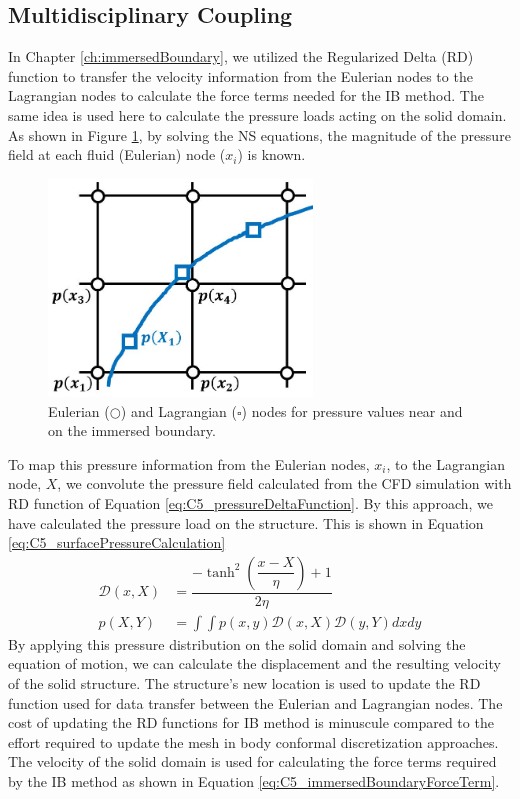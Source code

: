 \subsection{Multidisciplinary Coupling}
In Chapter \ref{ch:immersedBoundary}, we utilized the Regularized Delta (RD) function to transfer the velocity information from the Eulerian nodes to the Lagrangian nodes to calculate the force terms needed for the IB method. The same idea is used here to calculate the pressure loads acting on the solid domain. As shown in Figure \ref{fig:C5_pressureMapping}, by solving the NS equations, the magnitude of the pressure field at each fluid (Eulerian) node ($x_i$) is known.
%
\begin{figure}[H]
    \centering
    \includegraphics[width=7.00cm]{Chapter_5/figure/Chapter5_pressureMapping.jpg}
    \caption{Eulerian ($\bigcirc$) and Lagrangian ($\square$) nodes for pressure values near and on the immersed boundary.}
    \label{fig:C5_pressureMapping}
\end{figure}
%
To map this pressure information from the Eulerian nodes, $x_i$, to the Lagrangian node, $X$, we convolute the pressure field calculated from the CFD simulation with RD function of Equation \eqref{eq:C5_pressureDeltaFunction}.  By this approach, we have calculated the pressure load on the structure. This is shown in Equation \eqref{eq:C5_surfacePressureCalculation}
%
\begin{subequations}
\begin{align}
    \mathcal{D}(x, X) &=
    \dfrac{-\tanh^{2}{\left (\dfrac{x - X}{\eta} \right )} + 1}{2 \eta}
    \label{eq:C5_pressureDeltaFunction}
    \\
    p(X, Y) &= \int \int p(x,y) \mathcal{D}(x, X) \mathcal{D}(y, Y) dx dy
    \label{eq:C5_surfacePressureCalculation}
\end{align}
\end{subequations}
%
By applying this pressure distribution on the solid domain and solving the equation of motion, we can calculate the displacement and the resulting velocity of the solid structure. The structure's new location is used to update the RD function used for data transfer between the Eulerian and Lagrangian nodes. The cost of updating the RD functions for IB method is minuscule compared to the effort required to update the mesh in body conformal discretization approaches. The velocity of the solid domain is used for calculating the force terms required by the IB method as shown in Equation \eqref{eq:C5_immersedBoundaryForceTerm}.
